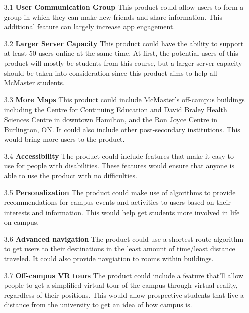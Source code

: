 \documentclass{article}
\begin{document}
\begin{itemize}
    \item[3.1] \textbf{User Communication Group} This product could allow users to form a group in which they can make new friends and share information. This additional feature can largely increase app engagement.

    \item[3.2] \textbf{Larger Server Capacity} This product could have the ability to support at least 50 users online at the same time. At first, the potential users of this product will mostly be students from this course, but a larger server capacity should be taken into consideration since this product aims to help all McMaster students.

    \item[3.3] \textbf{More Maps} This product could include McMaster's off-campus buildings including the Centre for Continuing Education and David Braley Health Sciences Centre in downtown Hamilton, and the Ron Joyce Centre in Burlington, ON. It could also include other post-secondary institutions. This would bring more users to the product.

    \item[3.4] \textbf{Accessibility} The product could include features that make it easy to use for people with disabilities. These features would ensure that anyone is able to use the product with no difficulties.
    
    \item[3.5] \textbf{Personalization} The product could make use of algorithms to provide recommendations for campus events and activities to users based on their interests and information. This would help get students more involved in life on campus.

    \item[3.6] \textbf{Advanced navigation} The product could use a shortest route algorithm to get users to their destinations in the least amount of time/least distance traveled. It could also provide navgiation to rooms within buildings.

    \item[3.7] \textbf{Off-campus VR tours} The product could include a feature that'll allow people to get a simplified virtual tour of the campus through virtual reality, regardless of their positions. This would allow prospective students that live a distance from the university to get an idea of how campus is.
\end{itemize}
\end{document}
